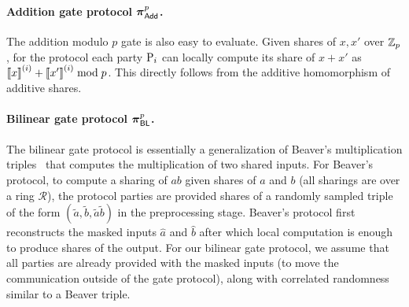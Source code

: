 \paragraph{Addition gate protocol $\boldsymbol{\pi}_{\textnormal{\textsf{Add}}}^{p}$.}
The addition modulo $p$ gate is also easy to evaluate. Given shares of $x, x'$ over $\mathbb{Z}_p$, for the protocol each party $\textnormal{P}_i$ can locally compute its share of $x+x'$ as $\left\llbracket x \right\rrbracket^{(i)} + \left\llbracket x' \right\rrbracket^{(i)} \bmod p$. This directly follows from the additive homomorphism of additive shares. 

\paragraph{Bilinear gate protocol $\boldsymbol{\pi}_{\textnormal{\textsf{BL}}}^p$.}
The bilinear gate protocol is essentially a generalization of Beaver's multiplication triples~\cite{boyle2019-fss-preprocess,beaver1991-triples} that computes the multiplication of two shared inputs. For Beaver's protocol, to compute a sharing of $ab$ given shares of $a$ and $b$ (all sharings are over a ring $\mathcal{R}$), the protocol parties are provided shares of a randomly sampled triple of the form $(\tilde{a},\tilde{b},\tilde{a}\tilde{b})$ in the preprocessing stage. Beaver's protocol first reconstructs the masked inputs $\hat{a}$ and $\hat{b}$ after which local computation is enough to produce shares of the output. For our bilinear gate protocol, we assume that  all parties are already provided with the masked inputs (to move the communication outside of the gate protocol), along with correlated randomness similar to a Beaver triple. 

